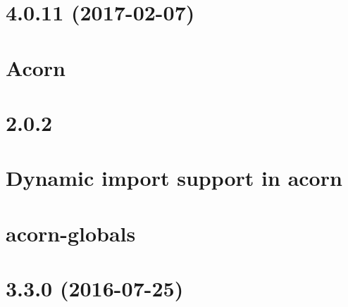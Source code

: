 \documentclass[twoside]{book}
\newcommand{\+}{\discretionary{\mbox{\scriptsize$\hookleftarrow$}}{}{}}
\begin{document}
\chapter{4.0.11 (2017-\/02-\/07)}
\label{md__c_1_workspace_demo_src_main_script_node_modules_acorn__c_h_a_n_g_e_l_o_g}

\chapter{Acorn}
\label{md__c_1_workspace_demo_src_main_script_node_modules_acorn__r_e_a_d_m_e}

\chapter{2.0.2}
\label{md__c_1_workspace_demo_src_main_script_node_modules_acorn-dynamic-import__c_h_a_n_g_e_l_o_g}

\chapter{Dynamic import support in acorn}
\label{md__c_1_workspace_demo_src_main_script_node_modules_acorn-dynamic-import__r_e_a_d_m_e}

\chapter{acorn-\/globals}
\label{md__c_1_workspace_demo_src_main_script_node_modules_acorn-globals__r_e_a_d_m_e}

\chapter{3.3.0 (2016-\/07-\/25)}
\label{md__c_1_workspace_demo_src_main_script_node_modules_acorn-jsx_node_modules_acorn__c_h_a_n_g_e_l_o_g}

\end{document}

